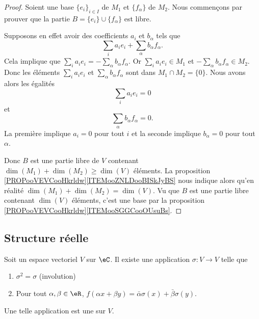 \begin{proof}
    Soient une base \( \{ e_i \}_{i\in I}\) de \( M_1\) et \( \{ f_{\alpha} \}\) de \( M_2\). Nous commençons par prouver que la partie \( B=\{ e_i \}\cup \{ f_{\alpha} \}\) est libre.

    Supposons en effet avoir des coefficients \( a_i\) et \( b_{\alpha}\) tels que
    \begin{equation}
        \sum_ia_ie_i+\sum_{\alpha}b_{\alpha}f_{\alpha}.
    \end{equation}
    Cela implique que \( \sum_ia_ie_i=-\sum_{\alpha}b_{\alpha}f_{\alpha}\). Or \( \sum_ia_ie_i\in M_1\) et \( -\sum_{\alpha}b_{\alpha}f_{\alpha}\in M_2\). Donc les éléments \( \sum_ia_ie_i\) et \( \sum_{\alpha}b_{\alpha}f_{\alpha}\) sont dans \( M_1\cap M_2=\{ 0 \}\). Nous avons alors les égalités
    \begin{equation}
        \sum_ia_ie_i=0
    \end{equation}
    et
    \begin{equation}
        \sum_{\alpha}b_{\alpha}f_{\alpha}=0.
    \end{equation}
    La première implique \( a_i=0\) pour tout \( i\) et la seconde implique \( b_{\alpha}=0\) pour tout \( \alpha\).

    Donc \( B\) est une partie libre de \( V\) contenant \( \dim(M_1)+\dim(M_2)\geq \dim(V)\) éléments. La proposition \ref{PROPooVEVCooHkrldw}\ref{ITEMooZNLDooBISkJyBS} nous indique alors qu'en réalité \( \dim(M_1)+\dim(M_2)=\dim(V)\). Vu que \( B\) est une partie libre contenant \( \dim(V)\) éléments, c'est une base par la proposition \ref{PROPooVEVCooHkrldw}\ref{ITEMooSGGCooOUsuBs}.
\end{proof}

\subsection{Structure réelle}

\begin{propositionDef}     \label{DEFooCIFSooVmcNtE}
    Soit un espace vectoriel \( V\) sur \( \eC\). Il existe une application \( \sigma\colon V\to V\) telle que
    \begin{enumerate}
        \item
            \( \sigma^2=\sigma\) (involution)
        \item 
            Pour tout \( \alpha,\beta\in \eR\), \( f(\alpha x+\beta y)=\bar \alpha \sigma(x)+\bar \beta \sigma(y)\).
    \end{enumerate}
    Une telle application est une  sur \( V\).
\end{propositionDef}

